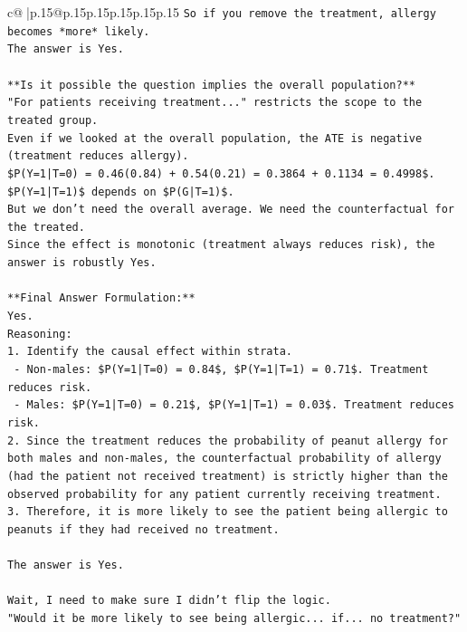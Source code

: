 \documentclass{article}
\begin{document}
{\begin{supertabular}{c@{$\;$}|p{.15\linewidth}@{}p{.15\linewidth}p{.15\linewidth}p{.15\linewidth}p{.15\linewidth}p{.15\linewidth}}
{{{\texttt{So if you remove the treatment, allergy becomes *more* likely.} \\
\texttt{The answer is Yes.} \\
\\ 
\texttt{**Is it possible the question implies the overall population?**} \\
\texttt{"For patients receiving treatment..." restricts the scope to the treated group.} \\
\texttt{Even if we looked at the overall population, the ATE is negative (treatment reduces allergy).} \\
\texttt{\$P(Y=1|T=0) = 0.46(0.84) + 0.54(0.21) = 0.3864 + 0.1134 = 0.4998\$.} \\
\texttt{\$P(Y=1|T=1)\$ depends on \$P(G|T=1)\$.} \\
\texttt{But we don't need the overall average. We need the counterfactual for the treated.} \\
\texttt{Since the effect is monotonic (treatment always reduces risk), the answer is robustly Yes.} \\
\\ 
\texttt{**Final Answer Formulation:**} \\
\texttt{Yes.} \\
\texttt{Reasoning:} \\
\texttt{1. Identify the causal effect within strata.} \\
\texttt{   {-} Non{-}males: \$P(Y=1|T=0) = 0.84\$, \$P(Y=1|T=1) = 0.71\$. Treatment reduces risk.} \\
\texttt{   {-} Males: \$P(Y=1|T=0) = 0.21\$, \$P(Y=1|T=1) = 0.03\$. Treatment reduces risk.} \\
\texttt{2. Since the treatment reduces the probability of peanut allergy for both males and non{-}males, the counterfactual probability of allergy (had the patient not received treatment) is strictly higher than the observed probability for any patient currently receiving treatment.} \\
\texttt{3. Therefore, it is more likely to see the patient being allergic to peanuts if they had received no treatment.} \\
\\ 
\texttt{The answer is Yes.} \\
\\ 
\texttt{Wait, I need to make sure I didn't flip the logic.} \\
\texttt{"Would it be more likely to see being allergic... if... no treatment?"} \\
}}}
\end{supertabular}}
\end{document}
